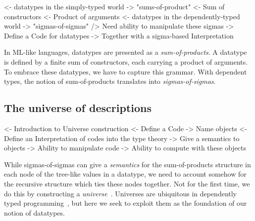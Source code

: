 \begin{wstructure}
<- datatypes in the simply-typed world
    -> "sums-of-product"
        <- Sum of constructors
        <- Product of arguments
<- datatypes in the dependently-typed world
    -> "sigmas-of-sigmas"
    /> Need ability to manipulate these sigmas
        -> Define a Code for datatypes
        -> Together with a sigma-based Interpretation
\end{wstructure}

In ML-like languages, datatypes are presented as a
\emph{sum-of-products}. A datatype is defined by a finite sum of
constructors, each carrying a product of arguments. To embrace
these datatypes, we have to capture this grammar.
With dependent types, the notion of sum-of-products translates into
\emph{sigmas-of-sigmas}.


\subsection{The universe of descriptions}
\label{sec:desc-universe}

\begin{wstructure}
<- Introduction to Universe construction
    <- Define a Code
        -> Name objects
    <- Define an Interpretation of codes into the type theory
        -> Give a semantics to objects
    -> Ability to manipulate code
    -> Ability to compute with these objects
\end{wstructure}

While sigmas-of-sigmas can give a \emph{semantics} for the
sum-of-products structure in each node of the tree-like values in a
datatype, we need to account somehow for the recursive structure which
ties these nodes together. Not for the first time, we do this by
constructing a \emph{universe}~\cite{martin-lof:itt}. Universes
are ubiquitous in dependently typed
programming~\cite{benke:universe-generic-prog, oury:power-of-pi},
but here we seek to exploit them as the foundation of our notion
of datatypes.



